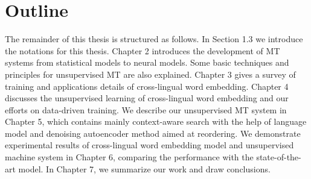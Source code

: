 \section{Outline}
The remainder of this thesis is structured as follows. In Section 1.3 we introduce the notations for this thesis. 
Chapter 2 introduces the development of MT systems from statistical models to  neural models. Some basic techniques and principles for unsupervised MT are also explained.  Chapter 3 gives a survey of training and applications details of cross-lingual word embedding. Chapter 4 discusses the unsupervised learning of cross-lingual word embedding and our efforts on data-driven training. We describe our unsupervised MT system in Chapter 5, which contains mainly context-aware search with the help of language model and denoising autoencoder method aimed at reordering. We demonstrate experimental results of cross-lingual word embedding model and unsupervised machine system in Chapter 6, comparing the performance with the state-of-the-art model. In Chapter 7, we summarize our work and draw conclusions.


